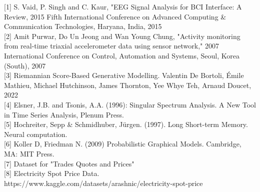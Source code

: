 \documentclass{article}
\begin{document}



[1] S. Vaid, P. Singh and C. Kaur, "EEG Signal Analysis for BCI Interface: A Review, 2015 Fifth International Conference on Advanced Computing \& Communication Technologies, Haryana, India, 2015 \\

[2] Amit Purwar, Do Un Jeong and Wan Young Chung, "Activity monitoring from real-time triaxial accelerometer data using sensor network," 2007 International Conference on Control, Automation and Systems, Seoul, Korea (South), 2007 \\

[3] Riemannian Score-Based Generative Modelling. 
Valentin De Bortoli, Émile Mathieu, Michael Hutchinson, James Thornton, Yee Whye Teh, Arnaud Doucet, 2022 \\

[4] Elsner, J.B. and Tsonis, A.A. (1996): Singular Spectrum Analysis. A New Tool in Time Series Analysis, Plenum Press. \\

[5] Hochreiter, Sepp \& Schmidhuber, Jürgen. (1997). Long Short-term Memory. Neural computation. \\

[6] Koller D, Friedman N. (2009) Probabilistic Graphical Models. Cambridge, MA: MIT Press. \\

[7] Dataset for "Trades Quotes and Prices" \\

[8] Electricity Spot Price Data. 
https://www.kaggle.com/datasets/arashnic/electricity-spot-price \\






\end{document}
